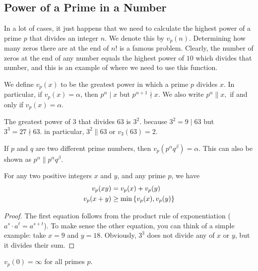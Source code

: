 \subsection{Power of a Prime in a Number} \label{sec:powerofprimes}
In a lot of cases, it just happens that we need to calculate the highest power of a prime $p$ that divides an integer $n$. We denote this by $v_p(n)$. Determining how many zeros there are at the end of $n!$ is a famous problem. Clearly, the number of zeros at the end of any number equals the highest power of $10$ which divides that number, and this is an example of where we need to use this function.

\begin{definition}\label{def:vp}
We define $v_p(x)$ to be the greatest power in which a prime $p$ divides $x$. In particular, if $v_p(x)=\alpha$, then $p^{\alpha} \mid x$ but $p^{\alpha+1} \nmid x$. We also write $p^{\alpha} \|  x, $ if and only if $v_p(x) = \alpha$.
\end{definition}

\begin{example}
The greatest power of $3$ that divides $63$ is $3^2.$ because $3^2=9 \mid 63$ but $3^3 =27 \nmid 63.$
in particular, $ 3^2 \|  63$ or $v_3(63)=2.$
\end{example}

\begin{example}
If $p$ and $q$ are two different prime numbers, then $ v_p( p^ \alpha q^ \beta) = \alpha$. This can also be shown as $p^\alpha \|  p^ \alpha q^ \beta$.
\end{example}

\begin{proposition} \label{prop:v_p-rule}
For any two positive integers $x$ and $y$, and any prime $p$, we have
\begin{align*}
	v_p(xy)
	& =v_p(x)+v_p(y)\\
	v_p(x+y)
	& \geq\min\left\{v_p(x),v_p(y)\right\}
\end{align*}
\end{proposition}

\begin{proof}
The first equation follows from the product rule of exponentiation ($a^{s} \cdot a^{t} = a^{s+t}$). To make sense the other equation, you can think of a simple example: take $x=9$ and $y=18$. Obviously, $3^3$ does not divide any of $x$ or $y$, but it divides their sum.
\end{proof}

\begin{note}
$v_p(0)=\infty$ for all primes $p.$
\end{note}


